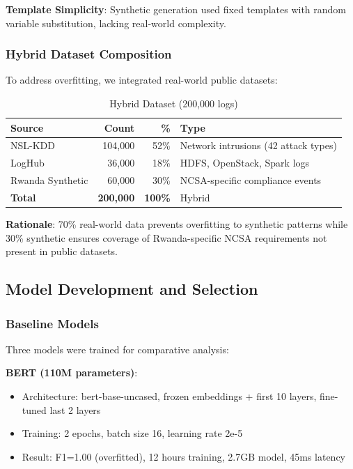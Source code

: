 \documentclass[11pt,conference]{IEEEtran}
\begin{document}
\textbf{Template Simplicity}: Synthetic generation used fixed templates with random variable substitution, lacking real-world complexity.

\subsubsection{Hybrid Dataset Composition}

To address overfitting, we integrated real-world public datasets:

\begin{table}[h]
\centering
\caption{Hybrid Dataset (200,000 logs)}
\begin{tabular}{lrrl}
\toprule
\textbf{Source} & \textbf{Count} & \textbf{\%} & \textbf{Type} \\
\midrule
NSL-KDD & 104,000 & 52\% & Network intrusions (42 attack types) \\
LogHub & 36,000 & 18\% & HDFS, OpenStack, Spark logs \\
Rwanda Synthetic & 60,000 & 30\% & NCSA-specific compliance events \\
\midrule
\textbf{Total} & \textbf{200,000} & \textbf{100\%} & Hybrid \\
\bottomrule
\end{tabular}
\end{table}

\textbf{Rationale}: 70\% real-world data prevents overfitting to synthetic patterns while 30\% synthetic ensures coverage of Rwanda-specific NCSA requirements not present in public datasets.

\subsection{Model Development and Selection}

\subsubsection{Baseline Models}

Three models were trained for comparative analysis:

\textbf{BERT (110M parameters)}:
\begin{itemize}
    \item Architecture: bert-base-uncased, frozen embeddings + first 10 layers, fine-tuned last 2 layers
    \item Training: 2 epochs, batch size 16, learning rate 2e-5
    \item Result: F1=1.00 (overfitted), 12 hours training, 2.7GB model, 45ms latency
\end{itemize}
\end{document}
